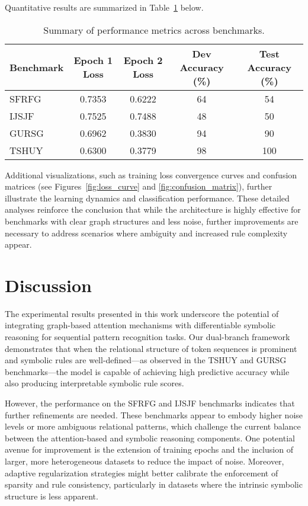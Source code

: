 \documentclass[11pt]{article}
\begin{document}
Quantitative results are summarized in Table~\ref{tab:results_summary} below.
\begin{table}[h]
\centering
\begin{tabular}{lcccc}
\hline
\textbf{Benchmark} & \textbf{Epoch 1 Loss} & \textbf{Epoch 2 Loss} & \textbf{Dev Accuracy (\%)} & \textbf{Test Accuracy (\%)} \\
\hline
SFRFG  & 0.7353 & 0.6222 & 64  & 54  \\
IJSJF  & 0.7525 & 0.7488 & 48  & 50  \\
GURSG  & 0.6962 & 0.3830 & 94  & 90  \\
TSHUY  & 0.6300 & 0.3779 & 98  & 100 \\
\hline
\end{tabular}
\caption{Summary of performance metrics across benchmarks.}
\label{tab:results_summary}
\end{table}
Additional visualizations, such as training loss convergence curves and confusion matrices (see Figures~\ref{fig:loss_curve} and \ref{fig:confusion_matrix}), further illustrate the learning dynamics and classification performance. These detailed analyses reinforce the conclusion that while the architecture is highly effective for benchmarks with clear graph structures and less noise, further improvements are necessary to address scenarios where ambiguity and increased rule complexity appear.

\section{Discussion}
The experimental results presented in this work underscore the potential of integrating graph-based attention mechanisms with differentiable symbolic reasoning for sequential pattern recognition tasks. Our dual-branch framework demonstrates that when the relational structure of token sequences is prominent and symbolic rules are well-defined—as observed in the TSHUY and GURSG benchmarks—the model is capable of achieving high predictive accuracy while also producing interpretable symbolic rule scores.

However, the performance on the SFRFG and IJSJF benchmarks indicates that further refinements are needed. These benchmarks appear to embody higher noise levels or more ambiguous relational patterns, which challenge the current balance between the attention-based and symbolic reasoning components. One potential avenue for improvement is the extension of training epochs and the inclusion of larger, more heterogeneous datasets to reduce the impact of noise. Moreover, adaptive regularization strategies might better calibrate the enforcement of sparsity and rule consistency, particularly in datasets where the intrinsic symbolic structure is less apparent.
\end{document}
